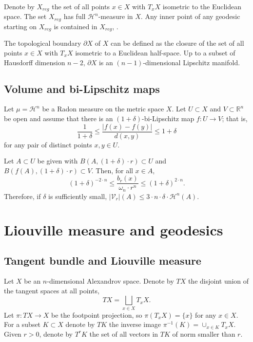 \documentclass[12pt,leqno,intlimits]{amsart}
\numberwithin{equation}{section}
\theoremstyle{definition}
\theoremstyle{remark}
\newcommand{\R}{\mathbb{R}}
\def\:{\colon}
\begin{document}
Denote by $X_{reg}$ the set of all points $x\in X$ with $T_xX$ isometric to the Euclidean space.
The set $X_{reg}$ has full $\mathcal H^n$-measure in $X$.
Any inner point of any geodesic starting on $X_{reg}$ is contained in $X_{reg}$, \cite{Petparallel}.

The topological boundary $\partial X$ of $X$ can be defined as the closure of the set of all points $x\in X$ with $T_xX$ isometric to a Euclidean half-space. Up to a subset of Hausdorff dimension $n-2$, $\partial X$ is an $(n-1)$-dimensional Lipschitz manifold.

\subsection{Volume and bi-Lipschitz maps}
Let $\mu =\mathcal H^n$ be a Radon measure on the metric space $X$.
Let $U\subset X$ and $V\subset \R^n$ be open and assume that there is an $(1+\delta)$-bi-Lipschitz map $f\:U \to V$;
that is,
\[\frac1{1+\delta}\le\frac{|f(x)-f(y)|}{d(x,y)}\le 1+\delta\]
for any pair of distinct points $x,y\in U$.

Let $A\subset U$ be given with
$B (A,{(1+\delta) \cdot r}) \subset U$ and $B (f(A),{(1+\delta) \cdot r}) \subset V$. Then, for all $x\in A$,
\begin{equation} \label{eq:bilip}
(1+\delta) ^{-2\cdot n} \leq \frac {b_r(x)} {\omega _n \cdot r^n} \leq (1+\delta ) ^{2\cdot n}.
\end{equation}
Therefore, if $\delta $ is sufficiently small, $|\mathcal{V}_r | (A) \leq 3\cdot  n \cdot \delta \cdot \mathcal H^n (A).$

\section{Liouville measure and geodesics} \label{sec:Liou}
\subsection{Tangent bundle and Liouville measure} \label{subsec:tb}
Let $X$ be an $n$-dimensional Alexandrov space.
Denote by $TX$ the disjoint union of the tangent spaces at all points,
\[TX=\bigsqcup_{x\in X} T_x X.\]
Let $\pi\:TX\to X$ be the footpoint projection, so $\pi (T_xX)=\{x\}$ for any $x\in X$. %
For a subset $K\subset X$ denote by $TK$ the inverse image $\pi^{-1} (K)= \cup _{x\in K} T_xX$. %
Given $r>0$, denote by $T^r K$ the set of all vectors in $TK$ of norm smaller than $r$.
\end{document}
